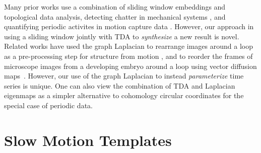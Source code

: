 \documentclass{article}
\begin{document}
Many prior works use a combination of sliding window embeddings and topological data analysis, detecting chatter in mechanical systems \cite{khasawneh2016chatter}, and quantifying periodic activites in motion capture data \cite{vejdemo2015cohomological, venkataraman2016persistent}. However, our approach in using a sliding window jointly with TDA to {\em synthesize} a new result is novel. Related works have used the graph Laplacian to rearrange images around a loop as a pre-processing step for structure from motion \cite{averbuch2015ringit}, and to reorder the frames of microscope images from a developing embryo around a loop using vector diffusion maps~\cite{dsilva2015diffusionvecordering}.  However, our use of the graph Laplacian to instead {\em parameterize} time series is unique. One can also view the combination of TDA and Laplacian eigenmaps as a simpler alternative to cohomology circular coordinates \cite{de2011persistent,vejdemo2015cohomological} for the special case of periodic data.


\section{Slow Motion Templates}
\label{sec:methods}

\end{document}
